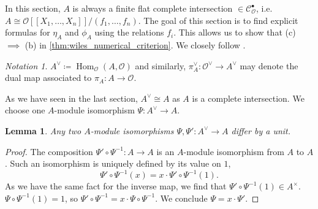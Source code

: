 \documentclass{article}
\theoremstyle{plain}%
\newtheorem{lemma}{Lemma}[section]
\theoremstyle{definition}
\theoremstyle{remark}
\newtheorem*{notation}{Notation}
\newcommand{\cob}{\mathcal{C}_\mathcal{O}^\bullet}
\renewcommand{\hom}{\operatorname{Hom}}
\begin{document}
In this section, \(A\) is always a finite flat complete intersection \(\in \cob\), 
i.e. \(A \cong \mathcal{O}[[X_1, \dots, X_n]]/(f_1, \dots, f_n)\).
The goal of this section is to find explicit formulas for \(\eta_A\) and \(\phi_A\) using
the relations \(f_i\). This allows us to show that (c) \(\implies\) (b) in \cref{thm:wiles_numerical_criterion}.
We closely follow \cite[chapter 5.4]{darmon1995fermat}.
\begin{notation}
    \(A^\vee \coloneqq \hom_\mathcal{O}(A, \mathcal{O})\) and similarly, \(\pi_A^\vee \colon \mathcal{O}^\vee \to A^\vee\) 
    may denote the dual map associated to \(\pi_A\colon A \to \mathcal{O}\).
\end{notation}
As we have seen in the last section, \(A^\vee \cong A\) as \(A\) is a complete intersection.
We choose one \(A\)-module isomorphism \(\Psi\colon A^\vee \to A\).
\begin{lemma}
    Any two \(A\)-module isomorphisms \(\Psi, \Psi' \colon A^\vee \to A\) differ by a unit.
\end{lemma}
\begin{proof}
    The composition \(\Psi' \circ \Psi^{-1} \colon A \to A\) is an \(A\)-module isomorphism from \(A\) to \(A\).
    Such an isomorphism is uniquely defined by its value on \(1\),
    \[
        \Psi' \circ \Psi^{-1}(x) = x \cdot \Psi' \circ \Psi^{-1}(1).
    \]
    As we have the same fact for the inverse map, we find that \(\Psi' \circ \Psi^{-1}(1) \in A^\times\).
    \(\Psi \circ \Psi^{-1}(1) = 1\), so \(\Psi' \circ \Psi^{-1} = x \cdot \Psi \circ \Psi^{-1}\).
    We conclude \(\Psi = x \cdot \Psi'\).
\end{proof}
\end{document}
